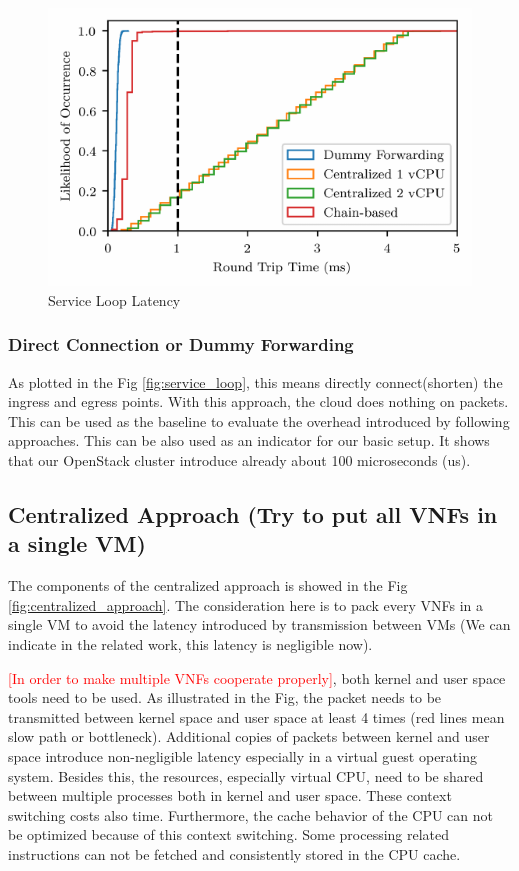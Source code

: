 \documentclass[12pt]{article}
\newcommand{\red}[1]{\textcolor{red}{ [#1]}}
\begin{document}
\begin{figure}[htpb]
    \centering
    \includegraphics[width=1\linewidth]{./figures/rtt_cdf_ipd_5ms.pdf}
    \caption{Service Loop Latency}
    \label{fig:service_loop_latency}
\end{figure}

\subsubsection{Direct Connection or Dummy Forwarding}%
\label{ssub:direct_connection_or_dummy_forwarding}

As plotted in the Fig \ref{fig:service_loop}, this means directly connect(shorten) the ingress and egress points. With
this approach, the cloud does nothing on packets. This can be used as the baseline to evaluate the overhead introduced
by following approaches. This can be also used as an indicator for our basic setup. It shows that our OpenStack cluster
introduce already about 100 microseconds (us).

\subsection{Centralized Approach (Try to put all VNFs in a single VM)}%
\label{sub:centralized}

The components of the centralized approach is showed in the Fig \ref{fig:centralized_approach}.
The consideration here is to pack every VNFs in a single VM to avoid the latency introduced by transmission between VMs
(We can indicate in the related work, this latency is negligible now).

\red{In order to make multiple VNFs cooperate properly}, both kernel and user space tools need to be used. As illustrated in
the Fig, the packet needs to be transmitted between kernel space and user space at least 4 times (red lines mean slow
path or bottleneck). Additional copies of packets between kernel and user space introduce non-negligible latency
especially in a virtual guest operating system. Besides this, the resources, especially virtual CPU, need to be shared
between multiple processes both in kernel and user space. These context switching costs also time. Furthermore, the
cache behavior of the CPU can not be optimized because of this context switching. Some processing related instructions
can not be fetched and consistently stored in the CPU cache.
\end{document}

